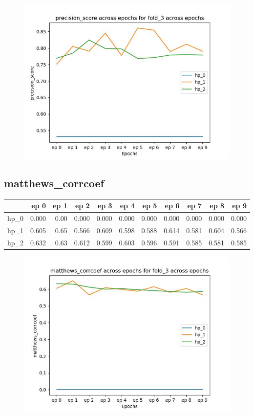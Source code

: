 \documentclass{article}
\begin{document}
\begin{figure}[H]
\includegraphics[scale = 0.75]{fold_3/precision_score}
\end{figure}
\subsection{matthews\_corrcoef}
\begin{tabular}{lrrrrrrrrrr}
\toprule
{} &   ep 0 &  ep 1 &   ep 2 &   ep 3 &   ep 4 &   ep 5 &   ep 6 &   ep 7 &   ep 8 &   ep 9 \\
\midrule
hp\_0 &  0.000 &  0.00 &  0.000 &  0.000 &  0.000 &  0.000 &  0.000 &  0.000 &  0.000 &  0.000 \\
hp\_1 &  0.605 &  0.65 &  0.566 &  0.609 &  0.598 &  0.588 &  0.614 &  0.581 &  0.604 &  0.566 \\
hp\_2 &  0.632 &  0.63 &  0.612 &  0.599 &  0.603 &  0.596 &  0.591 &  0.585 &  0.581 &  0.585 \\
\bottomrule
\end{tabular}

\begin{figure}[H]
\includegraphics[scale = 0.75]{fold_3/matthews_corrcoef}
\end{figure}
\end{document}
